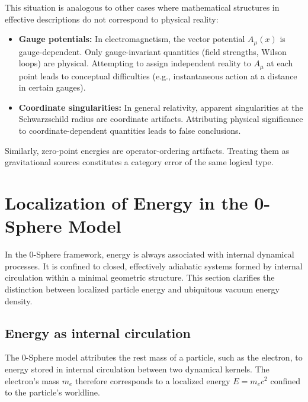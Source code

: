 \documentclass[12pt,letterpaper]{article}
\begin{document}
This situation is analogous to other cases where mathematical structures in effective descriptions do not correspond to physical reality:

\begin{itemize}
\item \textbf{Gauge potentials:} In electromagnetism, the vector potential $A_\mu(x)$ is gauge-dependent. Only gauge-invariant quantities (field strengths, Wilson loops) are physical. Attempting to assign independent reality to $A_\mu$ at each point leads to conceptual difficulties (e.g., instantaneous action at a distance in certain gauges).

\item \textbf{Coordinate singularities:} In general relativity, apparent singularities at the Schwarzschild radius are coordinate artifacts. Attributing physical significance to coordinate-dependent quantities leads to false conclusions.
\end{itemize}

Similarly, zero-point energies are operator-ordering artifacts. Treating them as gravitational sources constitutes a category error of the same logical type.

\section{Localization of Energy in the 0-Sphere Model}

In the 0-Sphere framework, energy is always associated with internal dynamical processes. It is confined to closed, effectively adiabatic systems formed by internal circulation within a minimal geometric structure. This section clarifies the distinction between localized particle energy and ubiquitous vacuum energy density.

\subsection{Energy as internal circulation}

The 0-Sphere model attributes the rest mass of a particle, such as the electron, to energy stored in internal circulation between two dynamical kernels. The electron's mass $m_e$ therefore corresponds to a localized energy $E = m_e c^2$ confined to the particle's worldline.
\end{document}
